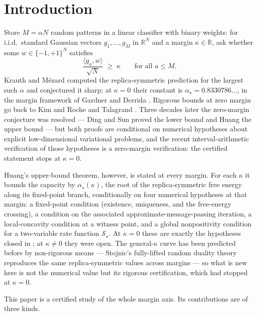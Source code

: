 \documentclass[11pt]{article}
\theoremstyle{remark}
\newcommand{\R}{\mathbb{R}}
\newcommand{\sS}{\mathcal{S}}
\begin{document}
\section{Introduction}

Store $M=\alpha N$ random patterns in a linear classifier with binary
weights: for i.i.d.\ standard Gaussian vectors $g_1,\dots,g_M$ in
$\R^N$ and a margin $\kappa\in\R$, ask whether some
$w\in\{-1,+1\}^N$ satisfies
\[
\frac{\langle g_a, w\rangle}{\sqrt N}\;\ge\;\kappa
\qquad\text{for all } a\le M .
\]
Krauth and M\'ezard \cite{krauth1989storage} computed the
replica-symmetric prediction for the largest such $\alpha$ and
conjectured it sharp; at $\kappa=0$ their constant is
$\alpha_\star=0.8330786\ldots$, in the margin framework of Gardner
and Derrida \cite{gardnerderrida1988}.  Rigorous bounds at zero margin
go back to Kim and Roche \cite{kimroche1998} and Talagrand
\cite{talagrand1999}.  Three decades later the zero-margin
conjecture was resolved --- Ding and Sun \cite{ding2019capacity}
proved the lower bound and Huang \cite{huang2024capacity} the upper
bound --- but both proofs are conditional on numerical hypotheses
about explicit low-dimensional variational problems, and the recent
interval-arithmetic verification of those hypotheses
\cite{shmalo2026capacity} is a zero-margin verification: the certified
statement stops at $\kappa=0$.

Huang's upper-bound theorem, however, is stated at every margin.  For
each $\kappa$ it bounds the capacity by $\alpha_\star(\kappa)$, the
root of the replica-symmetric free energy along its fixed-point
branch, conditionally on four numerical hypotheses at that margin: a
fixed-point condition (existence, uniqueness, and the free-energy
crossing), a condition on the associated approximate-message-passing
iteration, a local-concavity condition at a witness point, and a
global nonpositivity condition for a two-variable rate function
$\sS_\star$.  At $\kappa=0$ these are exactly the hypotheses closed in
\cite{shmalo2026capacity}; at $\kappa\ne0$ they were open.
The general-$\kappa$ curve has been predicted before by non-rigorous
means --- Stojnic's fully-lifted random duality
theory~\cite{stojnic2023} reproduces the same replica-symmetric
values across margins --- so what is new here is not the numerical
value but its rigorous certification, which had stopped at
$\kappa=0$.

This paper is a certified study of the whole margin axis.  Its
contributions are of three kinds.
\end{document}
